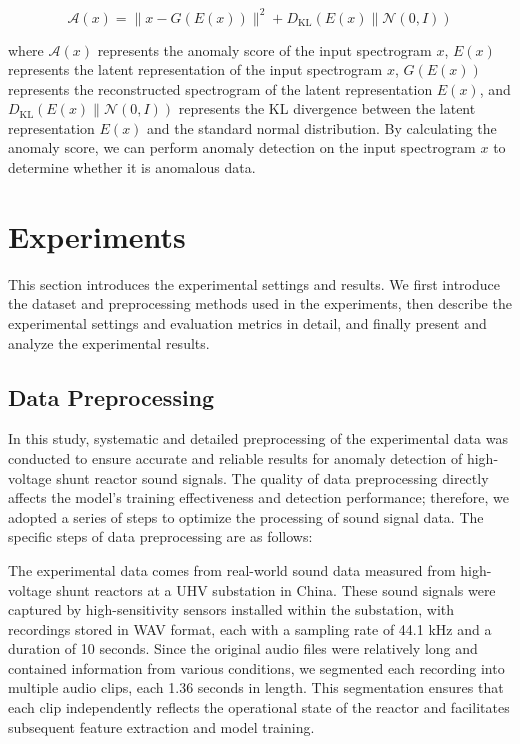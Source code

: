 \documentclass{article}
\begin{document}
\begin{equation}
\mathcal{A}(x)=\|x-G(E(x))\|^2+D_{\mathrm{KL}}(E(x) \| \mathcal{N}(0, I))
\end{equation}

where $\mathcal{A}(x)$ represents the anomaly score of the input spectrogram $x$, $E(x)$ represents the latent representation of the input spectrogram $x$, $G(E(x))$ represents the reconstructed spectrogram of the latent representation $E(x)$, and $D_{\mathrm{KL}}(E(x) \| \mathcal{N}(0, I))$ represents the KL divergence between the latent representation $E(x)$ and the standard normal distribution. By calculating the anomaly score, we can perform anomaly detection on the input spectrogram $x$ to determine whether it is anomalous data.

\section{Experiments}
This section introduces the experimental settings and results. We first introduce the dataset and preprocessing methods used in the experiments, then describe the experimental settings and evaluation metrics in detail, and finally present and analyze the experimental results.

\subsection{Data Preprocessing}

In this study, systematic and detailed preprocessing of the experimental data was conducted to ensure accurate and reliable results for anomaly detection of high-voltage shunt reactor sound signals. The quality of data preprocessing directly affects the model's training effectiveness and detection performance; therefore, we adopted a series of steps to optimize the processing of sound signal data. The specific steps of data preprocessing are as follows:

The experimental data comes from real-world sound data measured from high-voltage shunt reactors at a UHV substation in China. These sound signals were captured by high-sensitivity sensors installed within the substation, with recordings stored in WAV format, each with a sampling rate of 44.1 kHz and a duration of 10 seconds. Since the original audio files were relatively long and contained information from various conditions, we segmented each recording into multiple audio clips, each 1.36 seconds in length. This segmentation ensures that each clip independently reflects the operational state of the reactor and facilitates subsequent feature extraction and model training.
\end{document}
